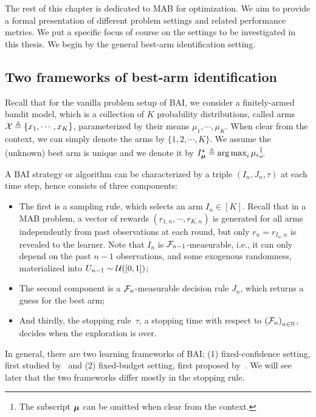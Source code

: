 The rest of this chapter is dedicated to MAB for optimization. We aim to provide a formal presentation of different problem settings and related performance metrics. We put a specific focus of course on the settings to be investigated in this thesis. We begin by the general best-arm identification setting.

\subsection{Two frameworks of best-arm identification}\label{sec:mab.bai.frameworks}

Recall that for the vanilla problem setup of BAI, we consider a finitely-armed bandit model, which is a collection of $K$ probability distributions, called arms $\mathcal{X}\triangleq\{x_1,\cdots,x_K\}$, parameterized by their means $\mu_1, \cdots, \mu_K$. When clear from the context, we can simply denote the arms by $\{1,2,\cdots,K\}$. We assume the (unknown) best arm is unique and we denote it by $I_{{\boldsymbol \mu}}^\star \triangleq \operatorname*{arg\,max}_i \mu_i$\footnote{The subscript ${\boldsymbol \mu}$ can be omitted when clear from the context.}. 

A BAI strategy or algorithm can be characterized by a triple $(I_n, J_n, \tau)$ at each time step, hence consists of three components: 
\begin{itemize}
    \item The first is a \gls{sampling rule}, which selects an arm $I_n\in[K]$. Recall that in a MAB problem, a vector of rewards $(r_{1,n},\cdots,r_{K,n})$ is generated for all arms independently from past observations at each round, but only $r_n = r_{I_n,n}$ is revealed to the learner. Note that $I_n$ is $\mathcal{F}_{n-1}$-measurable, i.e., it can only depend on the past $n-1$ observations, and some exogenous randomness, materialized into $U_{n-1} \sim \mathcal{U}([0,1])$;
    \item The second component is a $\mathcal{F}_{n}$-measurable \gls{decision rule} $J_n$, which returns a guess for the best arm;
    \item And thirdly, the \gls{stopping rule}~$\tau$, a stopping time with respect to $\left(\mathcal{F}_{n}\right)_{n \in \mathbb{N}}$, decides when the exploration is over.
\end{itemize}

In general, there are two learning frameworks of BAI: (1) \gls{fixed-confidence setting}, first studied by~\citep{even-dar2003confidence} and (2) \gls{fixed-budget setting}, first proposed by~\citep{audibert2010budget}. We will see later that the two frameworks differ mostly in the stopping rule.


